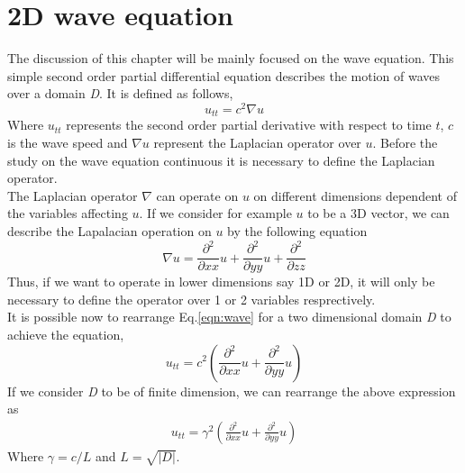 \section{2D wave equation}
\label{chapter3:sec1}
The discussion of this chapter will be mainly focused on the wave equation. This simple second order partial differential equation describes the motion of waves over a domain \textit{D}. It is defined as follows,
\begin{equation}
\label{eqn:wave}
	u_{tt}=c^{2}\nabla u
\end{equation} 
Where $u_{tt}$ represents the second order partial derivative with respect to time $t$, $c$ is the wave speed and $\nabla u$ represent the Laplacian operator over $u$. Before the study on the wave equation continuous it is necessary to define the Laplacian operator.\\
The Laplacian operator $\nabla$ can operate on $u$ on different dimensions dependent of the variables affecting $u$. If we consider for example $u$ to be a 3D vector, we can describe the Lapalacian operation on $u$ by the following equation
\begin{equation}
	\nabla u = \frac{\partial^2}{\partial xx}u + \frac{\partial^{2}}{\partial yy}u + \frac{\partial^{2}}{\partial zz}
\end{equation}
Thus, if we want to operate in lower dimensions say 1D or 2D, it will only be necessary to define the operator over 1 or 2 variables resprectively.\\
It is possible now to rearrange Eq.\ref{eqn:wave} for a two dimensional domain \textit{D} to achieve the equation,
\begin{equation}
	u_{tt}=c^{2}( \frac{\partial^2}{\partial xx}u + \frac{\partial^{2}}{\partial yy}u)	
\end{equation}
 If we consider \textit{D} to be of finite dimension, we can rearrange the above expression as
\begin{equation}
\label{eqn:wave2}
	\begin{aligned}
	u_{tt}=\gamma^{2}(\frac{\partial^2}{\partial xx}u + \frac{\partial^{2}}{\partial yy}u)
	\end{aligned}
\end{equation}
Where $\gamma=c/L$ and $L=\sqrt{|D|}$.\\
